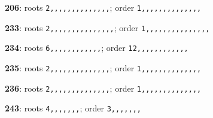 \noindent \textbf{206}: roots \texttt{2,,,,,,,,,,,,,,}; order \texttt{1,,,,,,,,,,,,,,}\par
\noindent \textbf{233}: roots \texttt{2,,,,,,,,,,,,,,,}; order \texttt{1,,,,,,,,,,,,,,,}\par
\noindent \textbf{234}: roots \texttt{6,,,,,,,,,,,,}; order \texttt{12,,,,,,,,,,,,}\par
\noindent \textbf{235}: roots \texttt{2,,,,,,,,,,,,,,}; order \texttt{1,,,,,,,,,,,,,,}\par
\noindent \textbf{236}: roots \texttt{2,,,,,,,,,,,,,,}; order \texttt{1,,,,,,,,,,,,,,}\par
\noindent \textbf{243}: roots \texttt{4,,,,,,,}; order \texttt{3,,,,,,,}\par

